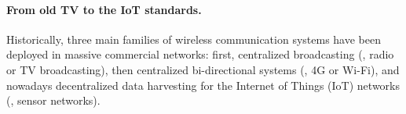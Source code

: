 \paragraph{From old TV to the IoT standards.}
%
Historically, three main families of wireless communication systems have been deployed in massive commercial networks: first, centralized broadcasting (\eg, radio or TV broadcasting), then centralized bi-directional systems (\eg, 4G or Wi-Fi), and nowadays decentralized data harvesting for the Internet of Things (IoT) networks (\eg, sensor networks).
%
%
